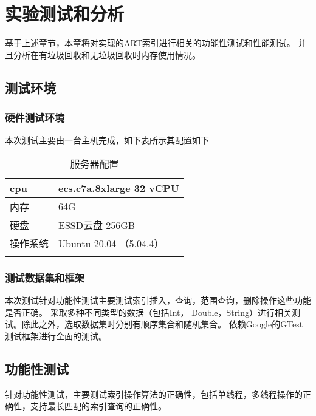 
\chapter{实验测试和分析}

基于上述章节，本章将对实现的ART索引进行相关的功能性测试和性能测试。
并且分析在有垃圾回收和无垃圾回收时内存使用情况。

\section{测试环境}

\subsection{硬件测试环境}
本次测试主要由一台主机完成，如下表所示其配置如下


\begin{table}
\centering
\captionsetup{labelformat=empty}
\caption{服务器配置}
\begin{tabular}{|l|l|} 
\hline
cpu                  & ecs.c7a.8xlarge 32 vCPU       \\ 
\hline
内存                   & 64G      \\ 
\hline
硬盘                   & ESSD云盘 256GB  \\ 
\hline
操作系统                 & Ubuntu 20.04 （5.04.4）    \\ 
\hline
\multicolumn{1}{l}{} & \multicolumn{1}{l}{}    
\end{tabular}
\end{table}

\subsection{测试数据集和框架}
本次测试针对功能性测试主要测试索引插入，查询，范围查询，删除操作这些功能是否正确。
采取多种不同类型的数据（包括Int， Double，String）进行相关测试。除此之外，选取数据集时分别有顺序集合和随机集合。
依赖Google的GTest测试框架进行全面的测试。

\section{功能性测试}

针对功能性测试，主要测试索引操作算法的正确性，包括单线程，多线程操作的正确性，支持最长匹配的索引查询的正确性。

